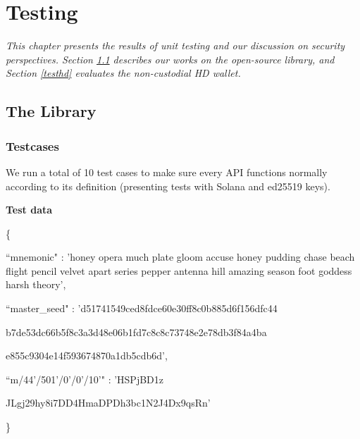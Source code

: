 \chapter{Testing}
\label{chap:testing}
\textit{This chapter presents the results of unit testing and our discussion on security perspectives. Section \ref{testlib} describes our works on the open-source library, and Section \ref{testhd} evaluates the non-custodial HD wallet.}

\minitoc

\section{The Library}
\label{testlib}
\subsection{Testcases}

We run a total of 10 test cases to make sure every API functions normally according to its definition (presenting tests with Solana and ed25519 keys). 

\bigskip
{\textbf{Test data}}

\begin{framed}
    \hspace*{13mm}        \{ \par
    \hspace*{13mm}        ``mnemonic" : 'honey opera much plate gloom accuse honey pudding chase beach flight pencil velvet apart series pepper antenna hill amazing season foot goddess harsh theory',    \par
    \hspace*{13mm}        ``master\_seed" : 'd51741549ced8fdce60e30ff8c0b885d6f156dfc44 \par
    \hspace*{27mm}         b7de53dc66b5f8c3a3d48e06b1fd7c8c8c73748e2e78db3f84a4ba \par
    \hspace*{27mm}         e855c9304e14f593674870a1db5cdb6d',    \par
    \hspace*{13mm}        ``m/44'/501'/0'/0'/10'" : 'HSPjBD1z \par
    \hspace*{37mm}        JLgj29hy8i7DD4HmaDPDh3bc1N2J4Dx9qsRn' \par
    \hspace*{13mm}              \} \par
    \end{framed}

